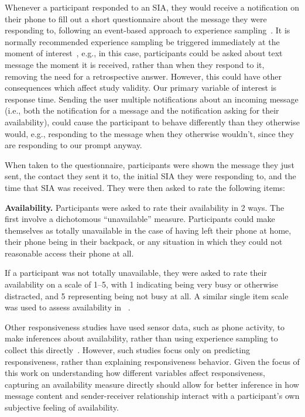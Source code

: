 \documentclass[12pt]{nuthesis}	%
\begin{document}
Whenever a participant responded to an SIA, they would receive a notification on their phone to fill out a short questionnaire about the message they were responding to, following an event-based approach to experience sampling~\citep{conner2009experience,csikszentmihalyi2014validity}. It is normally recommended experience sampling  be triggered immediately at the moment of interest~\citep{hormuth1986sampling}, e.g., in this case, participants could be asked about text message the moment it is received, rather than when they respond to it, removing the need for a retrospective answer. However, this could have other consequences which affect study validity. Our primary variable of interest is response time. Sending the user multiple notifications about an incoming message (i.e., both the notification for a message and the notification asking for their availability), could cause the participant to behave differently than they otherwise would, e.g., responding to the message when they otherwise wouldn't, since they are responding to our prompt anyway.

When taken to the questionnaire, participants were shown the message they just sent, the contact they sent it to, the initial SIA they were responding to, and the time that SIA was received. They were then asked to rate the following items:

\textbf{Availability.} Participants were asked to rate their availability in 2 ways. The first involve a dichotomous ``unavailable'' measure. Participants could make themselves as totally unavailable in the case of having left their phone at home, their phone being in their backpack, or any situation in which they could not reasonable access their phone at all.

If a participant was not totally unavailable, they were asked to rate their availability on a scale of 1--5, with 1 indicating being very busy or otherwise distracted, and 5 representing being not busy at all.  A similar single item scale was used to assess availability in ~\citet{fogarty2005predicting}.

Other responsiveness studies have used sensor data, such as phone activity, to make inferences about availability, rather than using experience sampling to collect this directly~\citep[e.g.,][]{pielot2014didn}. However, such studies focus only on predicting responsiveness, rather than explaining responsiveness behavior. Given the focus of this work on understanding how different variables affect responsiveness, capturing an availability measure directly should allow for better inference in how message content and sender-receiver relationship interact with a participant's own subjective feeling of availability.
\end{document}
